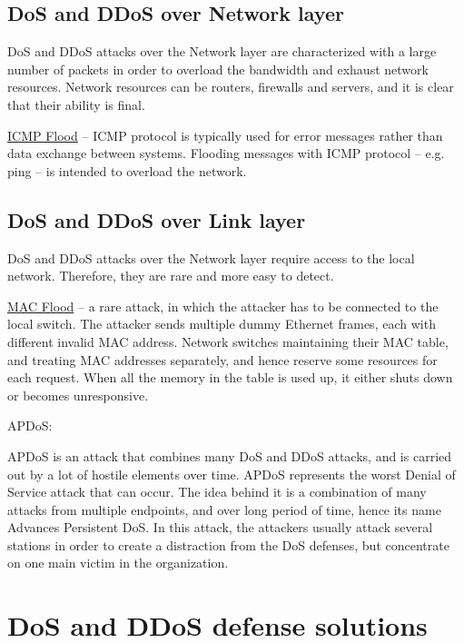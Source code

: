 \documentclass{report}
\begin{document}
\section {DoS and DDoS over Network layer} 

 \hfill \break DoS and DDoS attacks over the Network layer are characterized with a large number of packets in order to overload the bandwidth and exhaust network resources. Network resources can be routers, firewalls and servers, and it is clear that their ability is final.

 \hfill \break \underline{ICMP Flood} – ICMP protocol is typically used for error messages rather than data exchange between systems. Flooding messages with ICMP protocol – e.g. ping – is intended to overload the network.


\section {DoS and DDoS over Link layer}  

 \hfill \break DoS and DDoS attacks over the Network layer require access to the local network. Therefore, they are rare and more easy to detect.

 \hfill \break \underline{MAC Flood} – a rare attack, in which the attacker has to be connected to the local switch. The attacker sends multiple dummy Ethernet frames, each with different invalid MAC address. Network switches maintaining their MAC table, and treating MAC addresses separately, and hence reserve some resources for each request. When all the memory in the table is used up, it either shuts down or becomes unresponsive.



 \hfill \break APDoS:

 \hfill \break APDoS is an attack that combines many DoS and DDoS attacks, and is carried out by a lot of hostile elements over time. APDoS represents the worst Denial of Service attack that can occur. The idea behind it is a combination of many attacks from multiple endpoints, and over long period of time, hence its name Advances Persistent DoS. In this attack, the attackers usually attack several stations in order to create a distraction from the DoS defenses, but concentrate on one main victim in the organization.


\chapter{DoS and DDoS defense solutions }
\end{document}
